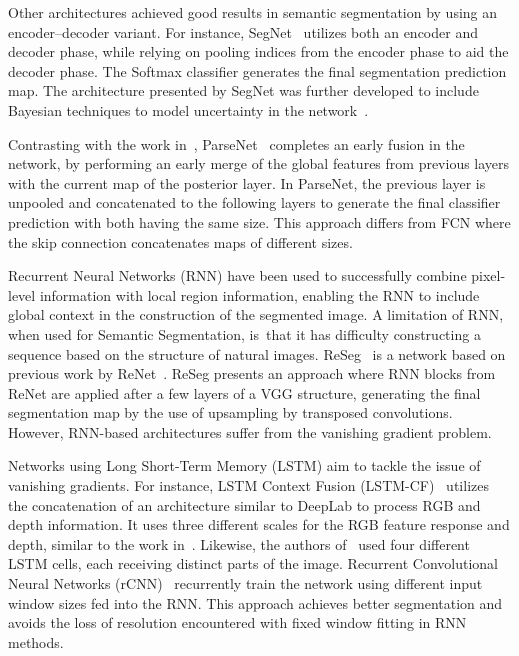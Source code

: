 \documentclass[sensors,article,accept,moreauthors,pdftex]{Definitions/mdpi}
\begin{document}
Other architectures achieved good results in semantic segmentation by using an encoder--decoder variant. For instance, SegNet~\cite{Segnet} utilizes both an encoder and decoder phase, while relying on pooling indices from the encoder phase to aid the decoder phase. The Softmax classifier generates the final segmentation prediction map. The architecture presented by SegNet was further developed to include Bayesian techniques to model uncertainty in the network~\cite{Bayesian-SegNet}.

Contrasting with the work in~\cite{FCN}, ParseNet~\cite{Parsenet} completes an early fusion in the network, by performing an early merge of the global features from previous layers with the current map of the posterior layer. In ParseNet, the previous layer is unpooled and concatenated to the following layers to generate the final classifier prediction with both having the same size. This approach differs from FCN where the skip connection concatenates maps of different sizes.

Recurrent Neural Networks (RNN) have been used to successfully combine pixel-level information with local region information, enabling the RNN to include global context in the construction of the segmented image. A limitation of RNN, when used for Semantic Segmentation, is~that it has difficulty constructing a sequence based on the structure of natural images. ReSeg~\cite{ReSeg} is a network based on previous work by ReNet~\cite{ReNet}. ReSeg presents an approach where RNN blocks from ReNet are applied after a few layers of a VGG structure, generating the final segmentation map by the use of upsampling by transposed convolutions. However, RNN-based architectures suffer from the vanishing gradient problem.

Networks using Long Short-Term Memory (LSTM) aim to tackle the issue of vanishing gradients. For instance, LSTM Context Fusion (LSTM-CF)~\cite{LSTM-CF} utilizes the concatenation of an architecture similar to DeepLab to process RGB and depth information. It uses three different scales for the RGB feature response and depth, similar to the work in~\cite{DeepContrast}. Likewise, the authors of~\cite{2D-LSTM} used four different LSTM cells, each receiving distinct parts of the image. Recurrent Convolutional Neural Networks (rCNN)~\cite{recurCNN} recurrently train the network using different input window sizes fed into the RNN.
This approach achieves better segmentation and avoids the loss of resolution encountered with fixed window fitting in RNN methods.
\end{document}

